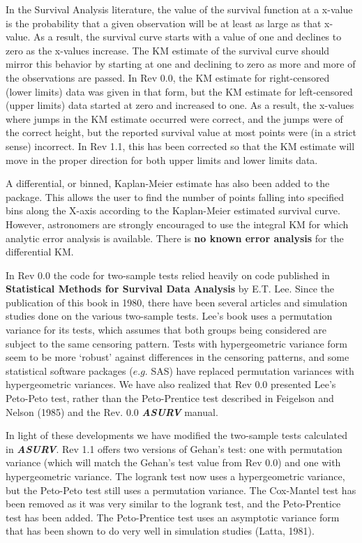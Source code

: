      In the Survival Analysis literature, the value of the survival function
at a x-value is the probability that a given observation will be at least as
large as that x-value.  As a result, the survival curve starts with a 
value of one and declines to zero as the x-values increase.  The 
KM estimate of the survival curve should mirror this behavior by 
starting at one and declining to zero as more and more of the observations
are passed.  In Rev 0.0, the KM estimate for right-censored (lower limits) 
data was given in that form, but the KM estimate for left-censored
(upper limits) data started at zero and increased to one.  As a result,
the x-values where jumps in the KM estimate occurred were correct, and the 
jumps were of the correct height, but the reported survival value at most 
points were (in a strict sense) incorrect.  In Rev 1.1, this has been
corrected so that the KM estimate will move in the proper direction for both
upper limits and lower limits data.  

     A differential, or binned, Kaplan-Meier estimate has also been added to
the package.  This allows the user to find the number of points falling into
specified bins along the X-axis according to the Kaplan-Meier estimated
survival curve.  However, astronomers are strongly encouraged to use the
integral KM for which analytic error analysis is available.  There is
{\bf no known error analysis} for the differential KM.


     In Rev 0.0 the code for two-sample tests relied heavily on code published
in {\bf Statistical Methods for Survival Data Analysis} by E.T. Lee.  Since the
publication of this book in 1980, there have been several articles and 
simulation studies done on the various two-sample tests.  Lee's book 
uses a permutation variance for its tests, which assumes that both 
groups being considered are subject to the same censoring pattern.  Tests 
with hypergeometric variance form seem to be more `robust' against differences
in the censoring patterns, and some statistical software packages 
($e.g.$ SAS) have replaced permutation variances with hypergeometric variances.
We have also realized that Rev 0.0 presented Lee's Peto-Peto test, rather
than the Peto-Prentice test described in Feigelson and Nelson (1985) and the
Rev. 0.0 {\sl\bf ASURV} manual.

     In light of these developments we have modified the two-sample tests
calculated in {\sl\bf ASURV}.  Rev 1.1 offers two versions of 
Gehan's test:  one with permutation variance (which will match the Gehan's 
test value from Rev 0.0) and one with hypergeometric variance.  The logrank 
test now uses a hypergeometric variance, but the Peto-Peto test still uses a 
permutation variance.  The Cox-Mantel test has been removed as it was very
similar to the logrank test, and the Peto-Prentice test has been added.  The
Peto-Prentice test uses an asymptotic variance form that has been shown to
do very well in simulation studies (Latta, 1981).

